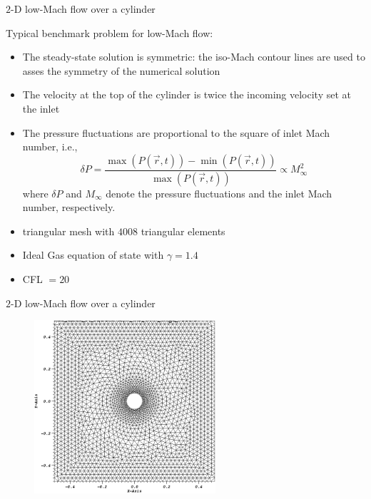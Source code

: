 \documentclass[xcolor=dvipsnames,10pt]{beamer}
\begin{document}
\begin{frame}{$2$-D low-Mach flow over a cylinder}
\begin{block}{Typical benchmark problem for low-Mach flow:}
\begin{itemize}
\item The steady-state solution is symmetric: the iso-Mach contour lines are used to asses the symmetry of the numerical solution
\item The velocity at the top of the cylinder is twice the incoming velocity set at the inlet
\item The pressure fluctuations are proportional to the square of inlet Mach number, i.e., 
\begin{equation}
\delta P = \frac{\max(P(\vec{r},t)) - \min(P(\vec{r},t))}{\max(P(\vec{r},t))}  \propto M_\infty^2 \nonumber
\end{equation}
where $\delta P$ and $M_\infty$ denote the pressure fluctuations and the inlet Mach number, respectively.
\end{itemize}
\end{block}
\begin{block}{}
\begin{itemize}
\item triangular mesh with $4008$ triangular elements
\item Ideal Gas equation of state with $\gamma = 1.4$
\item CFL $= 20$
\end{itemize}
\end{block}
\end{frame}
\begin{frame}{$2$-D low-Mach flow over a cylinder}
\begin{figure}[H]
\centering
\includegraphics[width=0.6\textwidth]{../figures/Cylinder_geometry.png}
\end{figure}
\end{frame}
\end{document}
